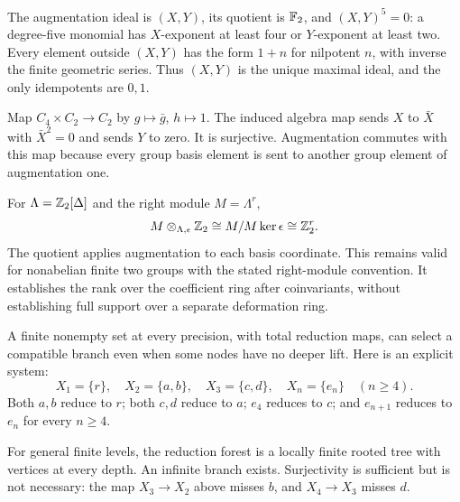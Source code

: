 The augmentation ideal is $(X,Y)$, its quotient is $\mathbb F_2$, and $(X,Y)^5=0$: a degree-five monomial has $X$-exponent at least four or $Y$-exponent at least two. Every element outside $(X,Y)$ has the form $1+n$ for nilpotent $n$, with inverse the finite geometric series. Thus $(X,Y)$ is the unique maximal ideal, and the only idempotents are $0,1$.

Map $C_4\times C_2\to C_2$ by $g\mapsto\bar g$, $h\mapsto1$. The induced algebra map sends $X$ to $\bar X$ with $\bar X^2=0$ and sends $Y$ to zero. It is surjective. Augmentation commutes with this map because every group basis element is sent to another group element of augmentation one.

For $\Lambda=\mathbb Z_2[\Delta]$ and the right module $M=\Lambda^r$,
\[
M\otimes_{\Lambda,\epsilon}\mathbb Z_2
\cong M/M\ker\epsilon\cong\mathbb Z_2^r.
\]
The quotient applies augmentation to each basis coordinate. This remains valid for nonabelian finite two groups with the stated right-module convention. It establishes the rank over the coefficient ring after coinvariants, without establishing full support over a separate deformation ring.


A finite nonempty set at every precision, with total reduction maps, can select a compatible branch even when some nodes have no deeper lift. Here is an explicit system:
\[
X_1=\{r\},\quad X_2=\{a,b\},\quad X_3=\{c,d\},\quad
X_n=\{e_n\}\quad(n\ge4).
\]
Both $a,b$ reduce to $r$; both $c,d$ reduce to $a$; $e_4$ reduces to $c$; and $e_{n+1}$ reduces to $e_n$ for every $n\ge4$.


For general finite levels, the reduction forest is a locally finite rooted tree with vertices at every depth. An infinite branch exists. Surjectivity is sufficient but is not necessary: the map $X_3\to X_2$ above misses $b$, and $X_4\to X_3$ misses $d$.

